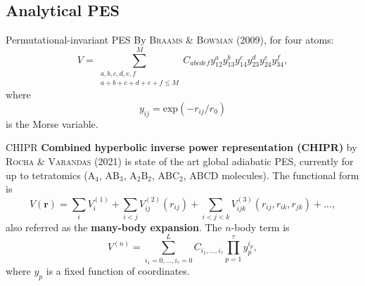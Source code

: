 \documentclass{beamer}
\begin{document}
\subsection{Analytical PES}
\begin{frame}{Permutational-invariant PES}
By \textsc{Braams \& Bowman} (2009), for four atoms:
    \begin{equation}
        V = \sum^M_{\substack{a,b,c,d,e,f \\ a+b+c+d+e+f \leq M}}C_{abcdef}y_{12}^a y_{13}^b y_{14}^c y_{23}^d y_{24}^e y_{34}^f,
        \label{eq:monomialc2h2}
    \end{equation}
    where
    \begin{equation}
        y_{ij} = \text{exp}(-r_{ij}/r_0)
        \label{eq:morse}
    \end{equation}
    is the Morse variable.
\end{frame}
\begin{frame}{CHIPR}
    \textbf{Combined hyperbolic inverse power representation (CHIPR)} by \textsc{Rocha \& Varandas} (2021) is state of the art global adiabatic PES, currently for up to tetratomics (A$_4$, AB$_3$, A$_2$B$_2$, ABC$_2$, ABCD molecules). The functional form is
    \begin{equation}
        V(\mathbf{r}) = \sum_i V_i^{(1)} + \sum_{i<j} V_{ij}^{(2)}(r_{ij}) + \sum_{i<j<k} V_{ijk}^{(3)}(r_{ij},r_{ik},r_{jk}) + ... ,
        \label{eq:chiprexpansion}
    \end{equation}
    also referred as the \textbf{many-body expansion}. The $n$-body term is
    \begin{equation}
        V^{(n)} = \sum^L_{i_1=0,...,i_\tau=0}C_{i_1,...,i_\tau}\prod^\tau_{p=1} y_p^{i_p},
        \label{eq:chiprnbody}
    \end{equation}
    where $y_p$ is a fixed function of coordinates.
\end{frame}

%
\end{document}
